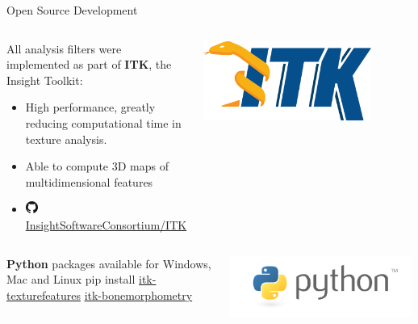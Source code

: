 \documentclass[10pt,aspectratio=169]{beamer}
\begin{document}
{\begin{frame}{Open Source Development}
  \begin{columns}[onlytextwidth]
    \begin{block}{All analysis filters were implemented as part of \textbf{ITK}, the Insight Toolkit:}
    \begin{itemize} \itemsep0.7em
      \item High performance, greatly reducing computational time in texture analysis.
      \item Able to compute 3D maps of multidimensional features
      \item[] \includegraphics[width=4mm]{./logos/logo_github.png}\hspace{0.2cm} \href{https://github.com/InsightSoftwareConsortium/ITK}{InsightSoftwareConsortium/ITK}
    \end{itemize}
  \end{block}
    \centering
    \includegraphics[width=0.8\textwidth]{./logos/logo_ITK.png}
  \end{columns}
  \vspace{0.2cm}
  \begin{columns}[onlytextwidth]
    \begin{block}{\textbf{Python} packages available for Windows, Mac and Linux}
      \centering
      pip install \href{https://github.com/InsightSoftwareConsortium/ITKTextureFeatures}{itk-texturefeatures} \href{https://github.com/InsightSoftwareConsortium/ITKBoneMorphometry}{itk-bonemorphometry}
  \end{block}
    \centering
    \includegraphics[width=0.99\textwidth]{./logos/logo_python.png}

\end{columns}
\end{frame}}
\end{document}
